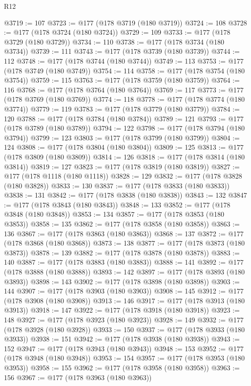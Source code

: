 \begin{lexlean}{R12}
\begin{coremodule}
{{{{{{{{{{{{{{{{{{{{{{{{{{{{{{{{{{{{{{{{{{{{{{{{{{{{{{{{{{{{{{{{{{{{{{{{{{{{{{{{{{@3719 := 107
@3723 := @177 (@178 @3719 (@180 @3719))
@3724 := 108
@3728 := @177 (@178 @3724 (@180 @3724))
@3729 := 109
@3733 := @177 (@178 @3729 (@180 @3729))
@3734 := 110
@3738 := @177 (@178 @3734 (@180 @3734))
@3739 := 111
@3743 := @177 (@178 @3739 (@180 @3739))
@3744 := 112
@3748 := @177 (@178 @3744 (@180 @3744))
@3749 := 113
@3753 := @177 (@178 @3749 (@180 @3749))
@3754 := 114
@3758 := @177 (@178 @3754 (@180 @3754))
@3759 := 115
@3763 := @177 (@178 @3759 (@180 @3759))
@3764 := 116
@3768 := @177 (@178 @3764 (@180 @3764))
@3769 := 117
@3773 := @177 (@178 @3769 (@180 @3769))
@3774 := 118
@3778 := @177 (@178 @3774 (@180 @3774))
@3779 := 119
@3783 := @177 (@178 @3779 (@180 @3779))
@3784 := 120
@3788 := @177 (@178 @3784 (@180 @3784))
@3789 := 121
@3793 := @177 (@178 @3789 (@180 @3789))
@3794 := 122
@3798 := @177 (@178 @3794 (@180 @3794))
@3799 := 123
@3803 := @177 (@178 @3799 (@180 @3799))
@3804 := 124
@3808 := @177 (@178 @3804 (@180 @3804))
@3809 := 125
@3813 := @177 (@178 @3809 (@180 @3809))
@3814 := 126
@3818 := @177 (@178 @3814 (@180 @3814))
@3819 := 127
@3823 := @177 (@178 @3819 (@180 @3819))
@3827 := @177 (@178 @1118 (@180 @1118))
@3828 := 129
@3832 := @177 (@178 @3828 (@180 @3828))
@3833 := 130
@3837 := @177 (@178 @3833 (@180 @3833))
@3838 := 131
@3842 := @177 (@178 @3838 (@180 @3838))
@3843 := 132
@3847 := @177 (@178 @3843 (@180 @3843))
@3848 := 133
@3852 := @177 (@178 @3848 (@180 @3848))
@3853 := 134
@3857 := @177 (@178 @3853 (@180 @3853))
@3858 := 135
@3862 := @177 (@178 @3858 (@180 @3858))
@3863 := 136
@3867 := @177 (@178 @3863 (@180 @3863))
@3868 := 137
@3872 := @177 (@178 @3868 (@180 @3868))
@3873 := 138
@3877 := @177 (@178 @3873 (@180 @3873))
@3878 := 139
@3882 := @177 (@178 @3878 (@180 @3878))
@3883 := 140
@3887 := @177 (@178 @3883 (@180 @3883))
@3888 := 141
@3892 := @177 (@178 @3888 (@180 @3888))
@3893 := 142
@3897 := @177 (@178 @3893 (@180 @3893))
@3898 := 143
@3902 := @177 (@178 @3898 (@180 @3898))
@3903 := 144
@3907 := @177 (@178 @3903 (@180 @3903))
@3908 := 145
@3912 := @177 (@178 @3908 (@180 @3908))
@3913 := 146
@3917 := @177 (@178 @3913 (@180 @3913))
@3918 := 147
@3922 := @177 (@178 @3918 (@180 @3918))
@3923 := 148
@3927 := @177 (@178 @3923 (@180 @3923))
@3928 := 149
@3932 := @177 (@178 @3928 (@180 @3928))
@3933 := 150
@3937 := @177 (@178 @3933 (@180 @3933))
@3938 := 151
@3942 := @177 (@178 @3938 (@180 @3938))
@3943 := 152
@3947 := @177 (@178 @3943 (@180 @3943))
@3948 := 153
@3952 := @177 (@178 @3948 (@180 @3948))
@3953 := 154
@3957 := @177 (@178 @3953 (@180 @3953))
@3958 := 155
@3962 := @177 (@178 @3958 (@180 @3958))
@3963 := 156
@3967 := @177 (@178 @3963 (@180 @3963))
}}}}}}}}}}}}}}}}}}}}}}}}}}}}}}}}}}}}}}}}}}}}}}}}}}}}}}}}}}}}}}}}}}}}}}}}}}}}}}}}}}
\end{coremodule}
\end{lexlean}
